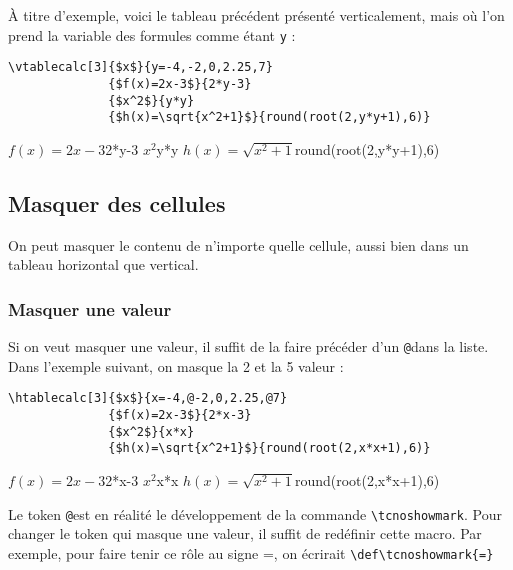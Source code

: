 \documentclass[a4paper,10pt]{article}
\newcommand\verbinline{\lstinline[breaklines=false,basicstyle=\normalsize\ttfamily]}
\newcommand\mywidth{0.85\linewidth}
\begin{document}
À titre d'exemple, voici le tableau précédent présenté verticalement, mais où l'on prend la variable des formules comme étant \verb=y= :\par\nobreak
\begin{center}
\begin{minipage}{\mywidth}
\begin{lstlisting}
\vtablecalc[3]{$x$}{y=-4,-2,0,2.25,7}
              {$f(x)=2x-3$}{2*y-3}
              {$x^2$}{y*y}
              {$h(x)=\sqrt{x^2+1}$}{round(root(2,y*y+1),6)}
\end{lstlisting}
\end{minipage}

              {$f(x)=2x-3$}{2*y-3}
              {$x^2$}{y*y}
              {$h(x)=\sqrt{x^2+1}$}{round(root(2,y*y+1),6)}
\end{center}

\subsection{Masquer des cellules}\label{masquercellules}
On peut masquer le contenu de n'importe quelle cellule, aussi bien dans un tableau horizontal que vertical.

\subsubsection{Masquer une valeur}
Si on veut masquer une valeur, il suffit de la faire précéder d'un \og\verb|@|\fg dans la liste. Dans l'exemple suivant, on masque la 2\ieme{} et la 5\ieme{} valeur :\smallskip
\begin{center}
\begin{minipage}{\mywidth}
\begin{lstlisting}
\htablecalc[3]{$x$}{x=-4,@-2,0,2.25,@7}
              {$f(x)=2x-3$}{2*x-3}
              {$x^2$}{x*x}
              {$h(x)=\sqrt{x^2+1}$}{round(root(2,x*x+1),6)}
\end{lstlisting}
\end{minipage}

              {$f(x)=2x-3$}{2*x-3}
              {$x^2$}{x*x}
              {$h(x)=\sqrt{x^2+1}$}{round(root(2,x*x+1),6)}
\end{center}
\medskip

Le token \og\verb|@|\fg est en réalité le développement de la commande \verbinline|\tcnoshowmark|. Pour changer le token qui masque une valeur, il suffit de redéfinir cette macro. Par exemple, pour faire tenir ce rôle au signe \og=\fg, on écrirait \verbinline|\def\tcnoshowmark{=}|
\end{document}
